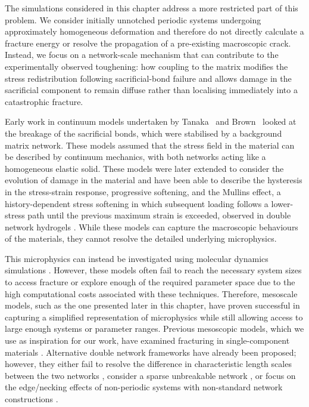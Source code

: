 The simulations considered in this chapter address a more restricted part of this problem. We consider initially unnotched periodic systems undergoing approximately homogeneous deformation and therefore do not directly calculate a fracture energy or resolve the propagation of a pre-existing macroscopic crack. Instead, we focus on a network-scale mechanism that can contribute to the experimentally observed toughening: how coupling to the matrix modifies the stress redistribution following sacrificial-bond failure and allows damage in the sacrificial component to remain diffuse rather than localising immediately into a catastrophic fracture.

Early work in continuum models undertaken by Tanaka~\cite{tanaka_local_2007} and Brown~\cite{brown_model_2007} looked at the breakage of the sacrificial bonds, which were stabilised by a background matrix network. These models assumed that the stress field in the material can be described by continuum mechanics, with both networks acting like a homogeneous elastic solid. These models were later extended to consider the evolution of damage in the material and have been able to describe the hysteresis in the stress-strain response, progressive softening, and the Mullins effect, a history-dependent stress softening in which subsequent loading follows a lower-stress path until the previous maximum strain is exceeded, observed in double network hydrogels \cite{vernereyStatisticalDamageMechanics2018, wang_pseudo-elasticity_2011, bacca_model_2017, lavoie_continuum_2019,okumura_toughness_2004,zhao_theory_2012}. While these models can capture the macroscopic behaviours of the materials, they cannot resolve the detailed underlying microphysics.

This microphysics can instead be investigated using molecular dynamics simulations \cite{jang_mechanical_2007,wang_simulational_2017,higuchi_fracture_2018,mugnaiInterspeciesInteractionsDual2025,tauber_sharing_2021}. However, these models often fail to reach the necessary system sizes to access fracture or explore enough of the required parameter space due to the high computational costs associated with these techniques. Therefore, mesoscale models, such as the one presented later in this chapter, have proven successful in capturing a simplified representation of microphysics while still allowing access to large enough systems or parameter ranges. Previous mesoscopic models, which we use as inspiration for our work, have examined fracturing in single-component materials \cite{dussi_athermal_2020, lei_mesoscopic_2021}. Alternative double network frameworks have already been proposed; however, they either fail to resolve the difference in characteristic length scales between the two networks \cite{tauber_microscopic_2020}, consider a sparse unbreakable network \cite{noguchi_fracture_2024}, or focus on the edge/necking effects of non-periodic systems with non-standard network constructions \cite{li_fracture_2024}. 

